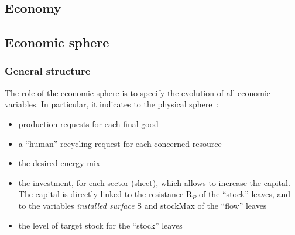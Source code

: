 \documentclass[12pt,a4paper]{article}%
\begin{document}
\begin{appendix}
\section{Economy}
\subsection{Economic sphere} 
\subsubsection{{General structure}}  
The role of the economic sphere is to specify the evolution of all economic variables. In particular, it indicates to the physical sphere~:  
\begin{itemize} 
	\item production requests for each final good 
	\item a ``human'' recycling request for each concerned resource 
	\item the desired energy mix 
	\item the investment, for each sector (sheet), which allows to increase the capital. The capital is directly linked to the resistance R$_{P}$ of the ``stock'' leaves, and to the variables \textit{installed surface} S and stockMax of the ``flow'' leaves 
	\item the level of target stock for the ``stock'' leaves 
\end{itemize} 


\end{appendix}
\end{document}
